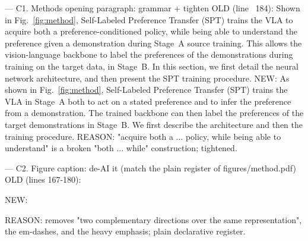 --- C1.  Methods opening paragraph: grammar + tighten
OLD (line ~184):
  Shown in Fig.~\ref{fig:method}, Self-Labeled Preference Transfer (SPT) trains the VLA to acquire both a preference-conditioned policy, while being able to understand the preference given a demonstration during Stage~A source training. This allows the vision-language backbone to label the preferences of the demonstrations during training on the target data, in Stage~B. In this section, we first detail the neural network architecture, and then present the SPT training procedure.
NEW:
  As shown in Fig.~\ref{fig:method}, Self-Labeled Preference Transfer (SPT) trains the VLA in Stage~A both to act on a stated preference and to infer the preference from a demonstration. The trained backbone can then label the preferences of the target demonstrations in Stage~B. We first describe the architecture and then the training procedure.
REASON: "acquire both a ... policy, while being able to understand" is a
  broken "both ... while" construction; tightened.


--- C2.  Figure caption: de-AI it (match the plain register of figures/method.pdf)
OLD (lines 167-180):
  \caption{\textbf{Self-Labeled Preference Transfer (SPT).} A single shared
  vision--language backbone supports two complementary directions over the same
  representation: a preference-conditioned \emph{action expert} that maps a stated
  preference to behavior (\emph{act on $c$}), and a preference-\emph{inference}
  branch---the backbone's own language head answering a binary preference
  question---that maps an observed demonstration back to its preference
  (\emph{infer $c$}). The inference branch is grounded in the executed motion by a
  learned token $\phi(s)$ of the robot's proprioceptive state.
  \emph{Stage~A} co-trains both directions on the preference-labeled source.
  \emph{Stage~B} freezes the source model, uses its inference direction to
  self-label every unlabeled target demonstration, and then continues training the
  action expert on those self-labeled, preference-conditioned prompts---using only
  the action loss. At test time the user specifies a preference from the source
  vocabulary and the inference branch is no longer needed.}
NEW:
  \caption{\textbf{Self-Labeled Preference Transfer (SPT).} One shared VLM
  backbone serves as a policy that acts on a stated preference (\emph{act on
  $c$}) and as a head that predicts the preference of a demonstration
  (\emph{infer $c$}). The prediction head reads the VLM's language output, and
  takes the proprioceptive state as a learned token $\phi(s)$. Stage~A trains
  both on the labeled source. Stage~B freezes this model, labels each unlabeled
  target demonstration with the prediction head, and continues training the
  action expert on the labeled prompts. At test time the user sets $c$ and only
  the policy is used.}
REASON: removes "two complementary directions over the same representation",
  the em-dashes, and the heavy emphasis; plain declarative register.



